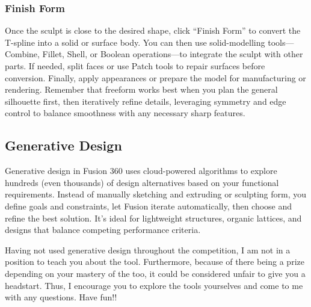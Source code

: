 \subsubsection{Finish Form}
Once the sculpt is close to the desired shape, click “Finish Form” to convert the T-spline into a solid or surface body. You can then use solid-modelling tools—Combine, Fillet, Shell, or Boolean operations—to integrate the sculpt with other parts. If needed, split faces or use Patch tools to repair surfaces before conversion. Finally, apply appearances or prepare the model for manufacturing or rendering. Remember that freeform works best when you plan the general silhouette first, then iteratively refine details, leveraging symmetry and edge control to balance smoothness with any necessary sharp features.

\subsection{Generative Design}

Generative design in Fusion 360 uses cloud-powered algorithms to explore hundreds (even thousands) of design alternatives based on your functional requirements. Instead of manually sketching and extruding or sculpting form, you define goals and constraints, let Fusion iterate automatically, then choose and refine the best solution. It’s ideal for lightweight structures, organic lattices, and designs that balance competing performance criteria. \par

Having not used generative design throughout the competition, I am not in a position to teach you about the tool. Furthermore, because of there being a prize depending on your mastery of the too, it could be considered unfair to give you a headstart. Thus, I encourage you to explore the tools yourselves and come to me with any questions. Have fun!!